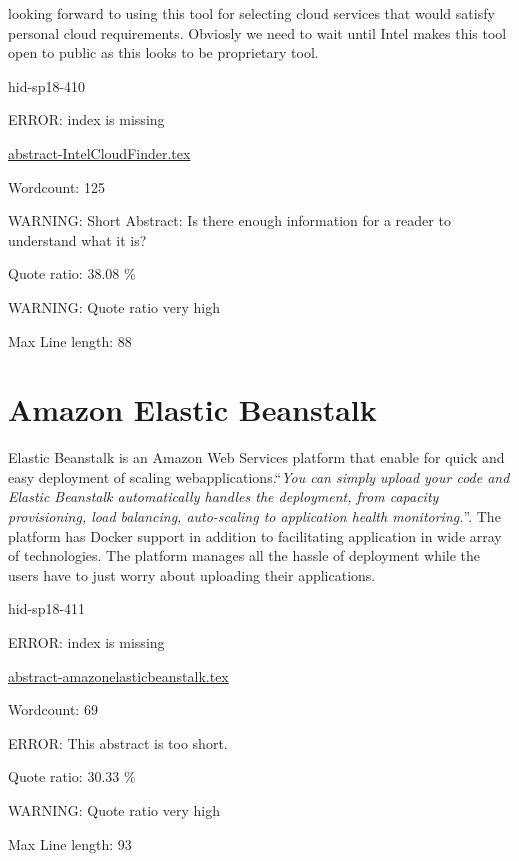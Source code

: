 looking forward to using this tool for selecting cloud
services that would satisfy personal cloud requirements. Obviosly we need to
wait until Intel makes this tool open to public as this looks to be
proprietary tool.


\begin{IU}

hid-sp18-410

ERROR: index is missing

\href{https://github.com/cloudmesh-community/hid-sp18-410/blob/master//technology/abstract-IntelCloudFinder.tex}{abstract-IntelCloudFinder.tex}

 

Wordcount: 125

WARNING: Short Abstract: Is there enough information for a reader to understand what it is?


Quote ratio: 38.08 \%

WARNING: Quote ratio very high
 
Max Line length: 88
\end{IU}

\section{Amazon Elastic Beanstalk}
Elastic Beanstalk is an Amazon Web Services platform that enable for quick
and easy deployment of scaling webapplications.\color{blue}``\emph{You can simply upload your
code and Elastic Beanstalk automatically handles the deployment, from
capacity provisioning, load balancing, auto-scaling to application health
monitoring.}''\color{black}\cite{hid-sp18-411-amazonelasticbeanstalk}. The platform has
Docker support in addition to facilitating application in wide array of
technologies. The platform manages all the hassle of deployment while the
users have to just worry about uploading their applications.


\begin{IU}

hid-sp18-411

ERROR: index is missing

\href{https://github.com/cloudmesh-community/hid-sp18-411/blob/master//technology/abstract-amazonelasticbeanstalk.tex}{abstract-amazonelasticbeanstalk.tex}

 

Wordcount: 69

ERROR: This abstract is too short.


Quote ratio: 30.33 \%

WARNING: Quote ratio very high
 
Max Line length: 93
\end{IU}

